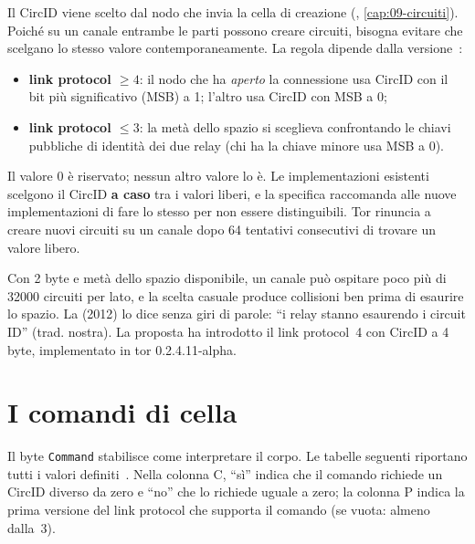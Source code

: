 Il CircID viene scelto dal nodo che invia la cella di creazione (, \cref{cap:09-circuiti}). Poiché su un canale entrambe le parti possono creare circuiti, bisogna evitare che scelgano lo stesso valore contemporaneamente. La regola dipende dalla versione~:
\begin{itemize}
  \item \textbf{link protocol $\ge 4$}: il nodo che ha \emph{aperto} la connessione usa CircID con il bit più significativo (MSB) a 1; l'altro usa CircID con MSB a 0;
  \item \textbf{link protocol $\le 3$}: la metà dello spazio si sceglieva confrontando le chiavi pubbliche di identità dei due relay (chi ha la chiave minore usa MSB a 0).
\end{itemize}
Il valore 0 è riservato; nessun altro valore lo è. Le implementazioni esistenti scelgono il CircID \textbf{a caso} tra i valori liberi, e la specifica raccomanda alle nuove implementazioni di fare lo stesso per non essere distinguibili. Tor rinuncia a creare nuovi circuiti su un canale dopo 64 tentativi consecutivi di trovare un valore libero.

\begin{approfondimento}
Con 2 byte e metà dello spazio disponibile, un canale può ospitare poco più di \num{32000} circuiti per lato, e la scelta casuale produce collisioni ben prima di esaurire lo spazio. La  (2012) lo dice senza giri di parole: \enquote{i relay stanno esaurendo i circuit ID} (trad. nostra). La proposta ha introdotto il link protocol~4 con CircID a 4 byte, implementato in tor 0.2.4.11-alpha.
\end{approfondimento}

\section{I comandi di cella}\label{sec:comandi}

Il byte \texttt{Command} stabilisce come interpretare il corpo. Le tabelle seguenti riportano tutti i valori definiti~. Nella colonna C, \enquote{sì} indica che il comando richiede un CircID diverso da zero e \enquote{no} che lo richiede uguale a zero; la colonna P indica la prima versione del link protocol che supporta il comando (se vuota: almeno dalla~3).

